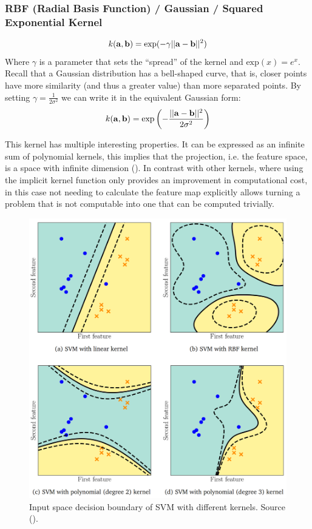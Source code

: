 \subsubsection*{RBF (Radial Basis Function) / Gaussian / Squared Exponential Kernel}
\begin{align}
    k(\mathbf{a}, \mathbf{b}) = \text{exp}(-\gamma ||\mathbf{a} - \mathbf{b}||^2)
\end{align}
Where $\gamma$ is a parameter that sets the “spread” of the kernel and $\text{exp}(x) = e^x$. Recall that a Gaussian distribution has a bell-shaped curve, that is, closer points have more similarity (and thus a greater value) than more separated points. By setting $\gamma = \frac{1}{2\sigma^2}$ we can write it in the equivalent Gaussian form:
\begin{align}
    k(\mathbf{a}, \mathbf{b}) = \text{exp}\left(-\frac{||\mathbf{a} - \mathbf{b}||^2}{2\sigma^2}\right)
\end{align}

This kernel has multiple interesting properties. It can be expressed as an infinite sum of polynomial kernels, this implies that the projection, i.e. the feature space, is a space with infinite dimension (\cite{bernstein_radial_2017}). In contrast with other kernels, where using the implicit kernel function only provides an improvement in com\-pu\-ta\-tion\-al cost, in this case not needing to calculate the feature map explicitly allows turning a problem that is not computable into one that can be computed trivially.

\begin{figure}[h]
    \centering
    \includegraphics[width=0.7\linewidth]{img/ch4/kernels.png}
    \caption[Decision boundary with non-linear kernel comparison]{Input space decision boundary of SVM with different kernels. Source (\cite{deisenroth_mathematics_2020}).}
    \label{fig:ch4.kernels}
\end{figure}


